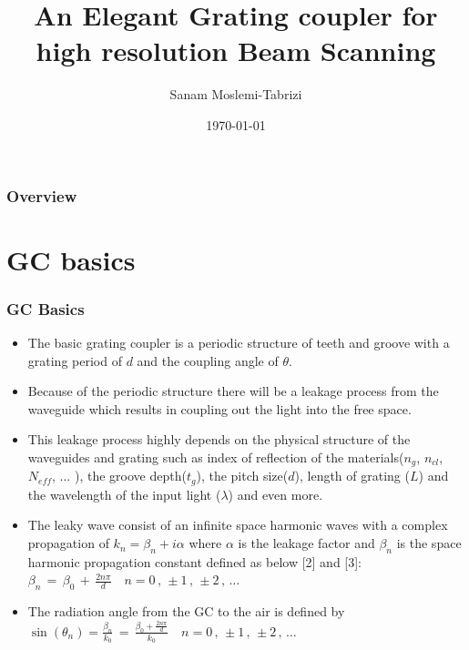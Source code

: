 \documentclass{beamer}
\title[An Elegant Grating coupler]{An Elegant Grating coupler for high resolution Beam Scanning} %
\author{Sanam Moslemi-Tabrizi} %
\institute[] %
{
Carleton University \\ %
\medskip
\textit{smoslemi@yahoo.ca} %
}
\date{\today} %
\begin{document}
\begin{frame}
\titlepage %
\end{frame}

\begin{frame}
\frametitle{Overview} %
\tableofcontents %
\end{frame}


\section{GC basics} %
\begin{frame}
\frametitle{GC Basics}
\begin{itemize}
\item The basic grating coupler is a periodic structure of teeth and groove with a grating period of $d$ and the coupling angle of $\theta.$ 
\item Because of the periodic structure there will be a leakage process from the waveguide which results in coupling out the light into the free space. 
\item This leakage process highly depends on the physical structure of the waveguides and grating such as index of reflection of the materials($n_g$, $n_{cl}$, $N_{eff}$, $\dots$ ), the groove depth($t_g$), the pitch size($d$), length of grating ($L$) and the wavelength of the input light ($\lambda $) and even more.
\item The leaky wave consist of an infinite space harmonic waves with a complex propagation of $k_n= \beta_n + i\alpha$ where $\alpha$ is the leakage factor and $\beta_n$ is the space harmonic propagation constant defined as below [2] and [3]:
$\beta_n \, = \, \beta_0 \, + \, \frac{2n\pi}{d} \quad n=0 \, , \,  \pm1 \, , \, \pm2 \, , \, \dots$
\item The radiation angle from the GC to the air is defined by $\sin(\theta_n)=\frac{\beta_n}{k_0}  \, = \,\frac{\beta_0 +\frac{2n\pi}{d}}{k_0} \quad n=0 \, , \,  \pm1 \, , \, \pm2 \, , \, \dots$

\end{itemize}
\end{frame}
%
\end{document}
